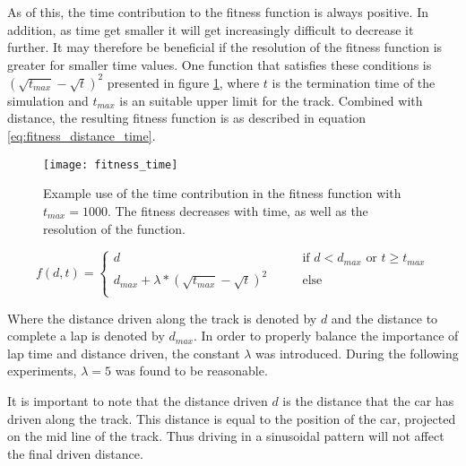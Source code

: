 As of this, the time contribution to the fitness function is always positive. In addition, as time get smaller it will get increasingly difficult to decrease it further. It may therefore be beneficial if the resolution of the fitness function is greater for smaller time values. One function that satisfies these conditions is \((\sqrt{t_{max}} - \sqrt{t})^2\) presented in figure \ref{figure:time_fitness}, where $t$ is the termination time of the simulation and $t_{max}$ is an suitable upper limit for the track. Combined with distance, the resulting fitness function is as described in equation \ref{eq:fitness_distance_time}.


\begin{figure}
\texttt{[image: fitness\_time]}
\caption{Example use of the time contribution in the fitness function with $t_{max} = 1000$. The fitness decreases with time, as well as the resolution of the function.}
\label{figure:time_fitness}
\centering
\end{figure}

\begin{equation}
\label{eq:fitness_distance_time}
  f(d, t) =
  \begin{cases}
    d    & \qquad \text{if } d < d_{max} \text{ or } t \geq t_{max} \\
    d_{max} + \lambda*(\sqrt{t_{max}} - \sqrt{t})^2 & \qquad \text{else} \\
  \end{cases}
\end{equation}

\noindent
Where the distance driven along the track is denoted by $d$ and the distance to complete a lap is denoted by $d_{max}$. In order to properly balance the importance of lap time and distance driven, the constant $\lambda$ was introduced. During the following experiments, $\lambda=5$ was found to be reasonable.


It is important to note that the distance driven $d$ is the distance that the car has driven along the track. This distance is equal to the position of the car, projected on the mid line of the track. Thus driving in a sinusoidal pattern will not affect the final driven distance.


